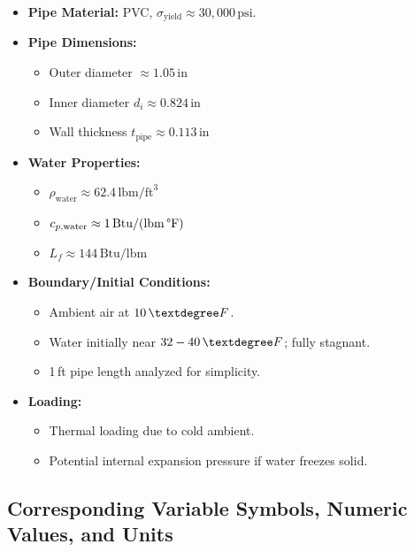 \documentclass[12pt]{article}
\begin{document}
\begin{itemize}
    \item \textbf{Pipe Material:} PVC, $\sigma_{\text{yield}} \approx 30,000\,\text{psi}$.
    \item \textbf{Pipe Dimensions:}
    \begin{itemize}
        \item Outer diameter $\approx 1.05\,\text{in}$
        \item Inner diameter $d_i \approx 0.824\,\text{in}$
        \item Wall thickness $t_{\text{pipe}} \approx 0.113\,\text{in}$
    \end{itemize}
    \item \textbf{Water Properties:}
    \begin{itemize}
        \item $\rho_{\text{water}} \approx 62.4\,\text{lbm/ft}^3$
        \item $c_{p,\text{water}} \approx 1\,\text{Btu/(lbm\,\textdegree F)}$
        \item $L_f \approx 144\,\text{Btu/lbm}$
    \end{itemize}
    \item \textbf{Boundary/Initial Conditions:}
    \begin{itemize}
        \item Ambient air at $10\,\textdegree F$.
        \item Water initially near $32-40\,\textdegree F$; fully stagnant.
        \item 1\,ft pipe length analyzed for simplicity.
    \end{itemize}
    \item \textbf{Loading:}
    \begin{itemize}
        \item Thermal loading due to cold ambient.
        \item Potential internal expansion pressure if water freezes solid.
    \end{itemize}
\end{itemize}

\subsection*{Corresponding Variable Symbols, Numeric Values, and Units}

\begin{itemize}
    \item $d_i = 0.824\,\text{in}, \quad L = 1\,\text{ft}$
    \item $\rho_{\text{water}} = 62.4\,\text{lbm/ft}^3, \quad c_{p,\text{water}} = 1\,\text{Btu/(lbm\,\textdegree F)}$
    \item $L_f = 144\,\text{Btu/lbm}$
    \item $h \approx 5\,\text{Btu/(hr\,ft}^2\,\textdegree F)}$ (moderate forced convection)
    \item $k_{\text{ins}} \approx 0.025\,\text{Btu/(hr\,ft\,\textdegree F)}$
    \item $t_{\text{pipe}} = 0.113\,\text{in}, \quad \sigma_{\text{yield}} \approx 30,000\,\text{psi}$
\end{itemize}
\end{document}
